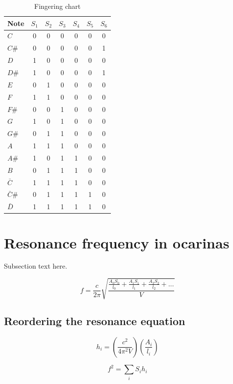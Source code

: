 \documentclass[journal]{IEEEtran}
\begin{document}
\begin{table}[h]
\center
\begin{tabular}{l|c|c|c|c|c|c}
Note & $S_1$ & $S_2$ & $S_3$ & $S_4$ & $S_5$ & $S_6$ \\ \hline
\hline 
$C$  & 0 & 0 & 0 & 0 & 0 & 0 \\
$C\#$& 0 & 0 & 0 & 0 & 0 & 1 \\
$D$  & 1 & 0 & 0 & 0 & 0 & 0 \\
$D\#$& 1 & 0 & 0 & 0 & 0 & 1 \\
$E$  & 0 & 1 & 0 & 0 & 0 & 0 \\
$F$  & 1 & 1 & 0 & 0 & 0 & 0 \\
$F\#$& 0 & 0 & 1 & 0 & 0 & 0 \\
$G$  & 1 & 0 & 1 & 0 & 0 & 0 \\
$G\#$& 0 & 1 & 1 & 0 & 0 & 0 \\
$A$  & 1 & 1 & 1 & 0 & 0 & 0 \\
$A\#$& 1 & 0 & 1 & 1 & 0 & 0 \\
$B$  & 0 & 1 & 1 & 1 & 0 & 0 \\
$\bar{C}$& 1 & 1 & 1 & 1 & 0 & 0 \\
$\bar{C}\#$& 0 & 1 & 1 & 1 & 1 & 0 \\
$\bar{D}$& 1 & 1 & 1 & 1 & 1 & 0 \\ 
\hline 
\end{tabular}
\caption{Fingering chart}
\label{table:chart}
\end{table}

\section{Resonance frequency in ocarinas}
Subsection text here.

\begin{equation} \label{EcA}
 f = \frac{c}{2 \pi} \sqrt{\frac{\frac{A_{0}S_{0}}{l_{0}}+\frac{A_{1}S_{1}}{l_{1}}+\frac{A_{2}S_{2}}{l_{2}}+ . . .}{V} }   
\end{equation}


\subsection{Reordering the resonance equation}
\begin{equation} \label{EcC}
 h_{i} =  \left( \frac{c^2}{4 {\pi}^2 V}\right) \left( \frac{A_{i}}{l_{i}}    \right)
\end{equation}

\begin{equation} \label{EcD}
 f^{2} = \sum_{i}{S_i h_i}
\end{equation}
\end{document}
